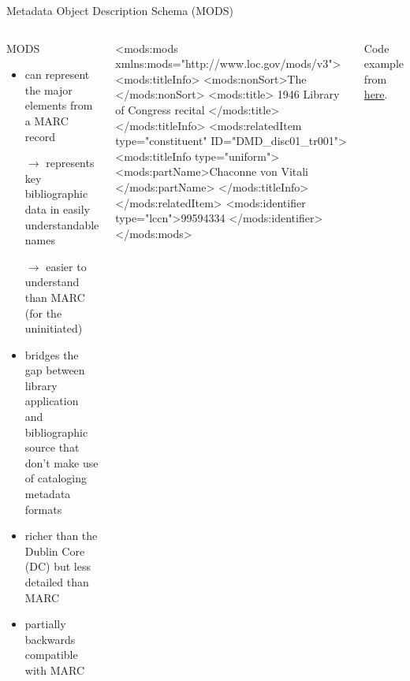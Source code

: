 
\begin{frame}[fragile]{Metadata Object Description Schema (MODS)}
\begin{columns}
\begin{block}{MODS}\scriptsize
\begin{itemize}
\item can represent the major elements from a MARC record
\item[$\to$] represents key bibliographic data in easily understandable names
\item[$\to$] easier to understand than MARC (for the uninitiated)
\item bridges the gap between library application and bibliographic source that don't make use of cataloging metadata formats
\item richer than the Dublin Core (DC) but less detailed than MARC
\item partially backwards compatible with MARC
\end{itemize}
\end{block}
\begin{xmlcode}
<mods:mods xmlns:mods="http://www.loc.gov/mods/v3">    
  <mods:titleInfo>
    <mods:nonSort>The </mods:nonSort>
    <mods:title>
      1946 Library of Congress recital
    </mods:title>
  </mods:titleInfo>
  <mods:relatedItem type="constituent" 
                    ID="DMD_disc01_tr001">
    <mods:titleInfo type="uniform">
      <mods:partName>Chaconne von Vitali
        </mods:partName>
    </mods:titleInfo>
  </mods:relatedItem>
  <mods:identifier type="lccn">99594334
    </mods:identifier>
</mods:mods>
\end{xmlcode}
Code example from \href{http://www.digitalhumanities.org/dhq/vol/3/3/000064/000064.html}{here}.
\end{columns}
\end{frame}



